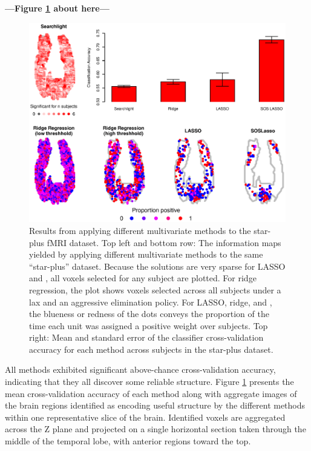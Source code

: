 \begin{center}
\textbf{---Figure \ref{fig.brain} about here---}
\end{center}

\begin{figure}
\centering
\includegraphics[width=.9\textwidth]{figures/cmu_all_results.eps}
\caption{Results from applying different multivariate methods to the star-plus fMRI dataset. Top left and bottom row: The information maps yielded by applying different multivariate methods to the same ``star-plus'' dataset. Because the solutions are very sparse for LASSO and \soslasso, all voxels selected for any subject are plotted. For ridge regression, the plot shows voxels selected across all subjects under a lax and an aggressive elimination policy. For LASSO, ridge, and \soslasso, the blueness or redness of the dots conveys the proportion of the time each unit was assigned a positive weight over subjects. Top right: Mean and standard error of the classifier cross-validation accuracy for each method across subjects in the star-plus dataset.}
\label{fig.brain}  
\end{figure}

All methods exhibited significant above-chance cross-validation accuracy, indicating that they all discover some reliable structure. Figure \ref{fig.brain} presents the mean cross-validation accuracy of each method along with aggregate images of the brain regions identified as encoding useful structure by the different methods within one representative slice of the brain.  Identified voxels are aggregated across the Z plane and projected on a single horizontal section taken through the middle of the temporal lobe, with anterior regions toward the top. 

